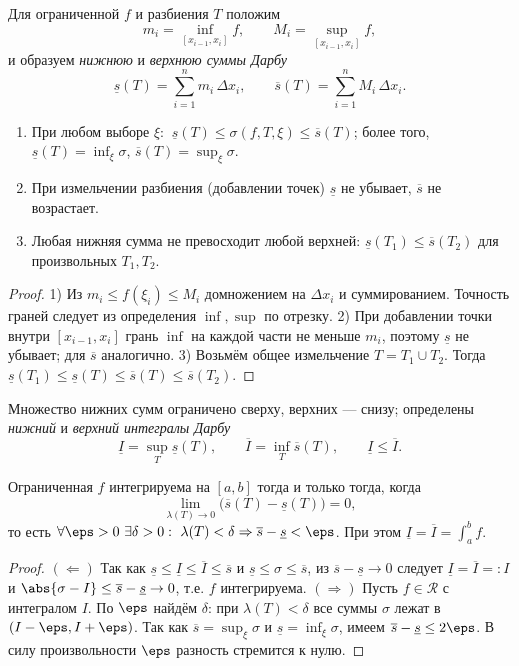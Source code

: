Для ограниченной $f$ и разбиения $T$ положим
\[
  m_i=\inf_{[x_{i-1},x_i]}f,\qquad M_i=\sup_{[x_{i-1},x_i]}f,
\]
и образуем \emph{нижнюю} и \emph{верхнюю суммы Дарбу}
\[
  \underline s(T)=\sum_{i=1}^n m_i\,\Delta x_i,\qquad
  \overline s(T)=\sum_{i=1}^n M_i\,\Delta x_i .
\]

\begin{property}\leavevmode
\begin{enumerate}[label=\arabic*),leftmargin=*]
  \item При любом выборе $\xi$: $\ \underline s(T)\le\sigma(f,T,\xi)\le\overline s(T)$; более того,
        $\underline s(T)=\inf_\xi\sigma$, $\overline s(T)=\sup_\xi\sigma$.
  \item При измельчении разбиения (добавлении точек) $\underline s$ не убывает, $\overline s$ не
        возрастает.
  \item Любая нижняя сумма не превосходит любой верхней: $\underline s(T_1)\le\overline s(T_2)$
        для произвольных $T_1,T_2$.
\end{enumerate}
\end{property}

\begin{proof}
1) Из $m_i\le f(\xi_i)\le M_i$ домножением на $\Delta x_i$ и суммированием. Точность граней
следует из определения $\inf,\sup$ по отрезку. 2) При добавлении точки внутри $[x_{i-1},x_i]$ грань
$\inf$ на каждой части не меньше $m_i$, поэтому $\underline s$ не убывает; для $\overline s$
аналогично. 3) Возьмём общее измельчение $T=T_1\cup T_2$. Тогда
$\underline s(T_1)\le\underline s(T)\le\overline s(T)\le\overline s(T_2)$.
\end{proof}

Множество нижних сумм ограничено сверху, верхних — снизу; определены \emph{нижний} и
\emph{верхний интегралы Дарбу}
\[
  \underline I=\sup_T \underline s(T),\qquad \overline I=\inf_T \overline s(T),
  \qquad \underline I\le\overline I .
\]

\begin{criterion}[Дарбу]
Ограниченная $f$ интегрируема на $[a,b]$ тогда и только тогда, когда
\[
  \lim_{\lambda(T)\to0}\bigl(\overline s(T)-\underline s(T)\bigr)=0,
\]
то есть $\forall\eps>0\ \exists\delta>0:\ \lambda(T)<\delta\Rightarrow\overline s-\underline s<\eps$.
При этом $\underline I=\overline I=\int_a^b f$.
\end{criterion}

\begin{proof}
$(\Leftarrow)$ Так как $\underline s\le\underline I\le\overline I\le\overline s$ и
$\underline s\le\sigma\le\overline s$, из $\overline s-\underline s\to0$ следует
$\underline I=\overline I=:I$ и $\abs{\sigma-I}\le\overline s-\underline s\to0$, т.е. $f$
интегрируема. $(\Rightarrow)$ Пусть $f\in\mathcal R$ с интегралом $I$. По $\eps$ найдём $\delta$:
при $\lambda(T)<\delta$ все суммы $\sigma$ лежат в $(I-\eps,I+\eps)$. Так как
$\overline s=\sup_\xi\sigma$ и $\underline s=\inf_\xi\sigma$, имеем
$\overline s-\underline s\le 2\eps$. В силу произвольности $\eps$ разность стремится к нулю.
\end{proof}


